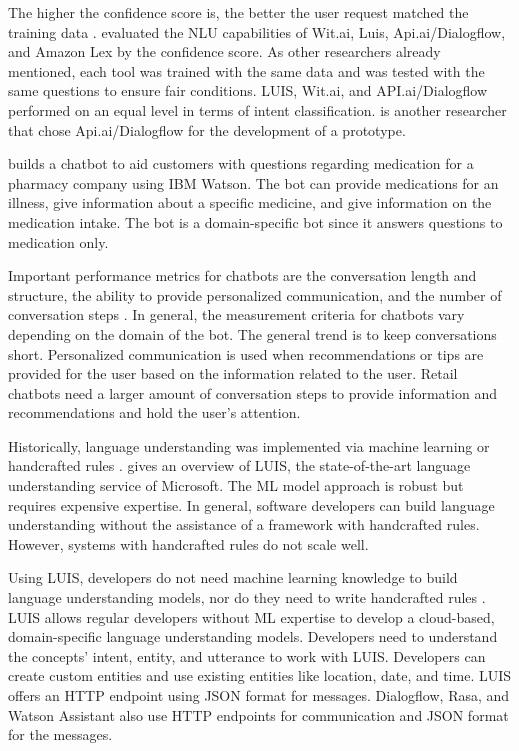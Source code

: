The higher the confidence score is, the better the user request matched the training data \cite{gregori2017evaluation}.
\citet{gregori2017evaluation} evaluated the NLU capabilities of Wit.ai, Luis, Api.ai/Dialogflow, and Amazon Lex\cite{lexconversational}
by the confidence score. 
As other researchers already mentioned, each tool was trained with the same data and was tested with the same questions to ensure fair conditions.
LUIS, Wit.ai, and API.ai/Dialogflow performed on an equal level in terms of intent classification.
\citet{gregori2017evaluation} is another researcher that chose Api.ai/Dialogflow for the development of a prototype.

\citet{pharmacybot} builds a chatbot to aid customers with questions regarding medication for a pharmacy company using IBM Watson.
The bot can provide medications for an illness, give information about a specific medicine, and give information on the medication intake.
The bot is a domain-specific bot since it answers questions to medication only.

Important performance metrics for chatbots are the conversation length and structure, the ability to provide personalized communication, and the number of conversation steps \cite{PRZEGALINSKA2019785}.
In general, the measurement criteria for chatbots vary depending on the domain of the bot.
The general trend is to keep conversations short.
Personalized communication is used when recommendations or tips are provided for the user based on the information related to the user.
Retail chatbots need a larger amount of conversation steps to provide information and recommendations and hold the user's attention.

Historically, language understanding was implemented via machine learning or handcrafted rules \cite{luis2015williams}.
\citet{luis2015williams} gives an overview of LUIS, the state-of-the-art language understanding service of Microsoft.
The ML model approach is robust but requires expensive expertise. 
In general, software developers can build language understanding without the assistance of a framework with handcrafted rules.
However, systems with handcrafted rules do not scale well.

Using LUIS, developers do not need machine learning knowledge to build language understanding models, nor do they need to write handcrafted rules \cite{luis2015williams}.
LUIS allows regular developers without ML expertise to develop a cloud-based, domain-specific language understanding models.
Developers need to understand the concepts' intent, entity, and utterance to work with LUIS.
Developers can create custom entities and use existing entities like location, date, and time.
LUIS offers an HTTP endpoint using JSON format for messages.
Dialogflow, Rasa, and Watson Assistant also use HTTP endpoints for communication and JSON format for the messages. 

